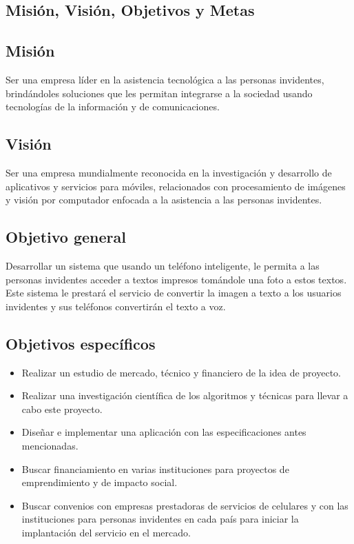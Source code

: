\documentclass[a4paper, 12pt, oneside]{article}
\begin{document}
	\begin{center}
	\section{Misión, Visión, Objetivos y Metas}
	\end{center}
	
	\subsection{Misión}
	Ser una empresa líder en la asistencia tecnológica a las personas invidentes, brindándoles
	soluciones que les permitan integrarse a la sociedad usando tecnologías
	de la información y de comunicaciones.
	
	\subsection{Visión}
	Ser una empresa mundialmente reconocida en la investigación y desarrollo de aplicativos y servicios
	para móviles, relacionados con procesamiento de imágenes y visión por computador enfocada a la 
	asistencia a las personas invidentes.
	
	\subsection{Objetivo general}
	Desarrollar un sistema que usando un teléfono inteligente, le permita a las personas invidentes acceder
	a textos impresos tomándole una foto a estos textos. Este sistema le prestará el servicio de convertir
	la imagen a texto a los usuarios invidentes y sus teléfonos convertirán el texto a voz.
	
	\subsection{Objetivos específicos}
	\begin{itemize}
	\item Realizar un estudio de mercado, técnico y financiero de la idea de proyecto.
	\item Realizar una investigación científica de los algoritmos y técnicas para llevar a cabo este proyecto.
	\item Diseñar e implementar una aplicación con las especificaciones antes mencionadas.
	\item Buscar financiamiento en varias instituciones para proyectos de emprendimiento y
	 de impacto social.
	\item Buscar convenios con empresas prestadoras de servicios de celulares y con las instituciones
	 para personas invidentes en cada país para iniciar la implantación del servicio en el mercado.
	\end{itemize}
	
\end{document}
